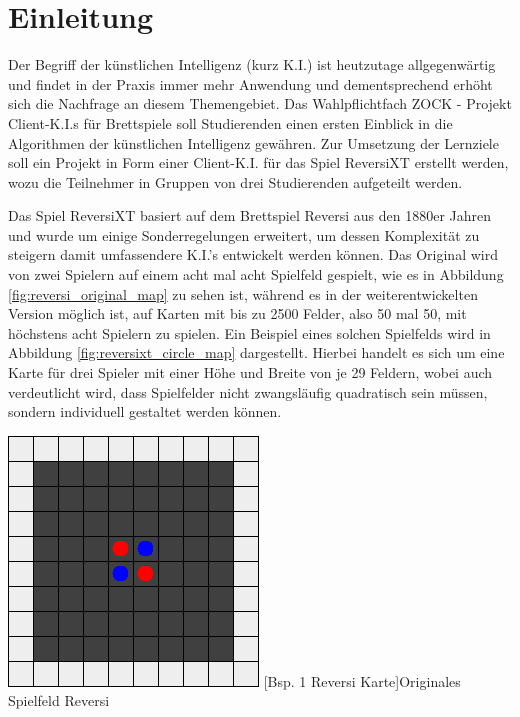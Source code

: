 \documentclass[12pt,a4paper,bibliography=totocnumbered,listof=totocnumbered]{article}
\begin{document}
\section{Einleitung} \label{kap:Einleitung}
Der Begriff der \glqq künstlichen Intelligenz\grqq{} (kurz K.I.) ist heutzutage allgegenwärtig und findet in der Praxis immer mehr Anwendung und dementsprechend erhöht sich die Nachfrage an diesem Themengebiet.
Das Wahlpflichtfach \glqq ZOCK - Projekt Client-K.I.s für Brettspiele\grqq{} soll Studierenden einen ersten Einblick in die Algorithmen der künstlichen Intelligenz gewähren. Zur Umsetzung der Lernziele soll ein Projekt in Form einer Client-K.I. für das Spiel ReversiXT erstellt werden, wozu die Teilnehmer in Gruppen von drei Studierenden aufgeteilt werden. 

Das Spiel ReversiXT basiert auf dem Brettspiel Reversi aus den 1880er Jahren und wurde um einige Sonderregelungen erweitert, um dessen Komplexität zu steigern damit umfassendere K.I.'s entwickelt werden können. Das Original wird von zwei Spielern auf einem acht mal acht Spielfeld gespielt, wie es in Abbildung \ref{fig:reversi_original_map} zu sehen ist, während es in der weiterentwickelten Version möglich ist, auf Karten mit bis zu 2500 Felder, also 50 mal 50, mit höchstens acht Spielern zu spielen. Ein Beispiel eines solchen Spielfelds wird in Abbildung \ref{fig:reversixt_circle_map} dargestellt. Hierbei handelt es sich um eine Karte für drei Spieler mit einer Höhe und Breite von je 29 Feldern, wobei auch verdeutlicht wird, dass Spielfelder nicht zwangsläufig quadratisch sein müssen, sondern individuell gestaltet werden können.

\vspace{1em}
\begin{minipage}{\linewidth}
	\centering
	\includegraphics[width=0.4\linewidth]{pics/reversi_original_map.png}
	[Bsp. 1 Reversi Karte]{Originales Spielfeld Reversi}
	\label{fig:reversi_original_map}
\end{minipage}
\\
\end{document}
